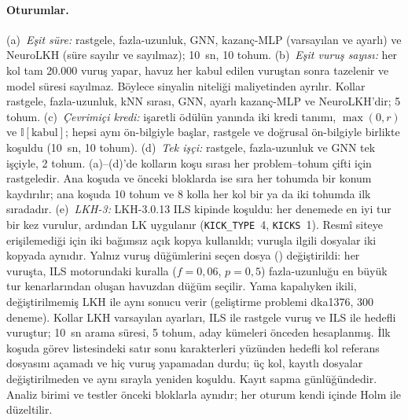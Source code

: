 \paragraph{Oturumlar.}
(a)~\emph{Eşit süre:} rastgele, fazla-uzunluk, GNN, kazanç-MLP (varsayılan ve ayarlı) ve NeuroLKH
(süre sayılır ve sayılmaz); 10~sn, 10 tohum.
(b)~\emph{Eşit vuruş sayısı:} her kol tam 20.000 vuruş yapar, havuz her kabul edilen vuruştan sonra
tazelenir ve model süresi sayılmaz. Böylece sinyalin niteliği maliyetinden ayrılır. Kollar rastgele,
fazla-uzunluk, kNN sırası, GNN, ayarlı kazanç-MLP ve NeuroLKH'dir; 5 tohum.
(c)~\emph{Çevrimiçi kredi:} işaretli ödülün yanında iki kredi tanımı, $\max(0,r)$ ve
$\mathbb{I}[\text{kabul}]$; hepsi aynı ön-bilgiyle başlar, rastgele ve doğrusal ön-bilgiyle birlikte
koşuldu (10~sn, 10 tohum).
(d)~\emph{Tek işçi:} rastgele, fazla-uzunluk ve GNN tek işçiyle, 2 tohum. (a)--(d)'de kolların koşu
sırası her problem--tohum çifti için rastgeledir. Ana koşuda ve önceki bloklarda ise sıra her tohumda
bir konum kaydırılır; ana koşuda 10 tohum ve 8 kolla her kol bir ya da iki tohumda ilk sıradadır.
(e)~\emph{LKH-3:} LKH-3.0.13 \citep{helsgaun_2017_lkh3} ILS kipinde koşuldu: her denemede en iyi tur
bir kez vurulur, ardından LK uygulanır (\texttt{KICK\_TYPE}~4, \texttt{KICKS}~1). Resmî siteye
erişilemediği için iki bağımsız açık kopya kullanıldı; vuruşla ilgili dosyalar iki kopyada aynıdır.
Yalnız vuruş düğümlerini seçen dosya () değiştirildi: her vuruşta, ILS motorundaki
kuralla ($f=0{,}06$, $p=0{,}5$) fazla-uzunluğu en büyük tur kenarlarından oluşan havuzdan düğüm
seçilir. Yama kapalıyken ikili, değiştirilmemiş LKH ile aynı sonucu verir (geliştirme problemi
dka1376, 300 deneme). Kollar LKH varsayılan ayarları, ILS ile rastgele vuruş ve ILS ile hedefli
vuruştur; 10~sn arama süresi, 5 tohum, aday kümeleri önceden hesaplanmış. İlk koşuda görev
listesindeki satır sonu karakterleri yüzünden hedefli kol referans dosyasını açamadı ve hiç vuruş
yapamadan durdu; üç kol, kayıtlı dosyalar değiştirilmeden ve aynı sırayla yeniden koşuldu. Kayıt sapma
günlüğündedir.
Analiz birimi ve testler önceki bloklarla aynıdır; her oturum kendi içinde Holm ile düzeltilir.
